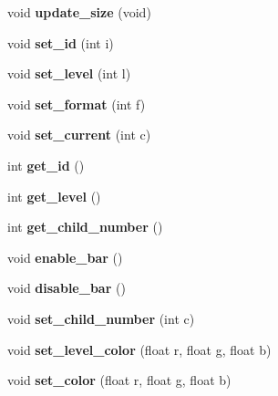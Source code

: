\begin{DoxyCompactItemize}
\item 
\hypertarget{classGLUI__Tree_ae74e9b85940ce63ebac36ef650e845ae}{void {\bfseries update\-\_\-size} (void)}\label{classGLUI__Tree_ae74e9b85940ce63ebac36ef650e845ae}

\item 
\hypertarget{classGLUI__Tree_a4508292bef2dd0bdaed4a4806b950a5e}{void {\bfseries set\-\_\-id} (int i)}\label{classGLUI__Tree_a4508292bef2dd0bdaed4a4806b950a5e}

\item 
\hypertarget{classGLUI__Tree_a1978367b73bb522adc7995e6bf7c8c98}{void {\bfseries set\-\_\-level} (int l)}\label{classGLUI__Tree_a1978367b73bb522adc7995e6bf7c8c98}

\item 
\hypertarget{classGLUI__Tree_ad650ae32ac0061df975433cd2a93374f}{void {\bfseries set\-\_\-format} (int f)}\label{classGLUI__Tree_ad650ae32ac0061df975433cd2a93374f}

\item 
\hypertarget{classGLUI__Tree_ac9a7d0223c26a6ddee9eba5f3872e8ef}{void {\bfseries set\-\_\-current} (int c)}\label{classGLUI__Tree_ac9a7d0223c26a6ddee9eba5f3872e8ef}

\item 
\hypertarget{classGLUI__Tree_a586224df7ba4df860a1cb90d00b754f7}{int {\bfseries get\-\_\-id} ()}\label{classGLUI__Tree_a586224df7ba4df860a1cb90d00b754f7}

\item 
\hypertarget{classGLUI__Tree_aeb41bc5144951acc90520e0d6d494309}{int {\bfseries get\-\_\-level} ()}\label{classGLUI__Tree_aeb41bc5144951acc90520e0d6d494309}

\item 
\hypertarget{classGLUI__Tree_a09d07235daca64350c7d253bb937732b}{int {\bfseries get\-\_\-child\-\_\-number} ()}\label{classGLUI__Tree_a09d07235daca64350c7d253bb937732b}

\item 
\hypertarget{classGLUI__Tree_a5d669dacda1b1edb9ada2fbce957e4ca}{void {\bfseries enable\-\_\-bar} ()}\label{classGLUI__Tree_a5d669dacda1b1edb9ada2fbce957e4ca}

\item 
\hypertarget{classGLUI__Tree_a7f39a382e4c3adc1634267de80276c7f}{void {\bfseries disable\-\_\-bar} ()}\label{classGLUI__Tree_a7f39a382e4c3adc1634267de80276c7f}

\item 
\hypertarget{classGLUI__Tree_a7b854371a9ab38f30bb83acc9d762b84}{void {\bfseries set\-\_\-child\-\_\-number} (int c)}\label{classGLUI__Tree_a7b854371a9ab38f30bb83acc9d762b84}

\item 
\hypertarget{classGLUI__Tree_a1b8694b525dcc72d11945c5d41565e2b}{void {\bfseries set\-\_\-level\-\_\-color} (float r, float g, float b)}\label{classGLUI__Tree_a1b8694b525dcc72d11945c5d41565e2b}

\item 
\hypertarget{classGLUI__Tree_a421127bfedefee3c5fb9c17202ca4bc7}{void {\bfseries set\-\_\-color} (float r, float g, float b)}\label{classGLUI__Tree_a421127bfedefee3c5fb9c17202ca4bc7}

\end{DoxyCompactItemize}
